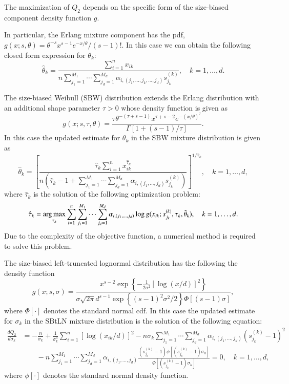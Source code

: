 \documentclass[eng]{csam}
\def\a{\alpha}
\def\s{\sigma}
\def\argmax{\operatornamewithlimits{arg\,max}}
\begin{document}
The maximization of $Q_2$ depends on the specific form of the size-biased component density function $g$.

In particular, the Erlang mixture component has the pdf, $g(x; s, \theta) = \theta^{-s} x^{s-1}e^{-x/\theta}/(s-1)!$. In this case we can obtain the following closed form expression for $\theta_k$:
\begin{equation*}
\hat{\theta}_k = \frac{\sum_{i=1}^n x_{ik}}{n \sum_{j_1 = 1}^{M_1} \cdots\sum_{j_d = 1}^{M_d} \a_{i,(j_1,\ldots,j_k, \ldots, j_d)}s^{(k)}_{j_k}},\quad k=1,\ldots, d.
\end{equation*}

The size-biased Weibull (SBW) distribution extends the Erlang distribution with an additional shape parameter $\tau >0$ whose density function is given as
\begin{equation*}
g(x;s, \tau, \theta) = \frac{\tau \theta^{-(\tau+ s -1)} x^{\tau + s -2}e^{-(x/\theta)^{\tau}}}{\Gamma[1+(s-1)/\tau]}.
\end{equation*}
In this case the updated estimate for $\theta_k$ in the SBW mixture distribution is given as
\begin{equation*}
\hat{\theta}_k = \left[\frac{\hat{\tau}_k \sum_{i=1}^n x^{\hat{\tau}_k}_{ik}}{n\left(\hat{\tau}_k-1 + \sum_{j_1 = 1}^{M_1} \cdots\sum_{j_d = 1}^{M_d} \a_{i,(j_1,\ldots,j_d)} s^{(k)}_{j_k}\right)}\right]^{1/\hat{\tau}_k},\quad k = 1,\ldots, d,
\end{equation*}
where $\hat{\tau}_k$ is the solution of the following optimization problem:
\begin{equation*}
\hat{\tau}_k = \argmax_{\tau_k} \sum_{i=1}^n \sum_{j_1 = 1}^{M_1} \cdots\sum_{j_d = 1}^{M_d} \a_{i,(j_1,\ldots,j_d)}\log g(x_{ik};s^{(k)}_{j_k}, \tau_k,\hat{\theta}_k),\quad k = 1,\ldots, d.
\end{equation*}
Due to the complexity of the objective function, a numerical method is required to solve this problem.

The size-biased left-truncated lognormal distribution has the following the density function
\begin{equation*}
g(x;s, \sigma) = \frac{x^{s-2}\exp\left\{-\frac{1}{2\s^2}\left[\log(x/d)\right]^2\right\}}{\sigma \sqrt{2\pi} d^{s-1}\exp\left\{(s-1)^2 \s^2 /2\right\}\Phi[(s-1)\sigma]},
\end{equation*}
where $\Phi[\cdot]$ denotes the standard normal cdf. In this case the updated estimate for $\sigma_k$ in the SBtLN mixture distribution is the solution of the following equation:
\begin{align*}
\frac{d Q_2}{d \sigma_k} &= - \frac{n}{\sigma_k} + \frac{1}{\sigma^3_k} \sum_{i=1}^n\left[\log (x_{ik}/d)\right]^2 - n \sigma_k \sum_{j_1 = 1}^{M_1} \cdots\sum_{j_d = 1}^{M_d} \a_{i,(j_1,\ldots,j_d)} (s^{(k)}_{j_k} -1)^2\\
&\qquad - n\sum_{j_1 = 1}^{M_1} \cdots\sum_{j_d = 1}^{M_d} \a_{i,(j_1,\ldots,j_d)} \frac{(s^{(k)}_{j_k} -1)\phi[(s^{(k)}_{j_k} -1)\sigma_k]}{\Phi[(s^{(k)}_{j_k} -1)\sigma_k]} = 0,\quad k=1,\ldots,d,
\end{align*}
where $\phi[\cdot]$ denotes the standard normal density function.
\end{document}
